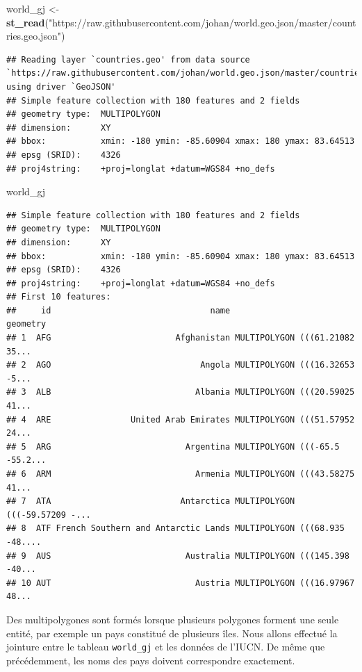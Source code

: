 \documentclass[]{book}
\newenvironment{Shaded}{\begin{snugshade}}{\end{snugshade}}
\newcommand{\KeywordTok}[1]{\textcolor[rgb]{0.13,0.29,0.53}{\textbf{#1}}}
\newcommand{\NormalTok}[1]{#1}
\newcommand{\StringTok}[1]{\textcolor[rgb]{0.31,0.60,0.02}{#1}}
\begin{document}
\begin{Shaded}
\begin{Highlighting}[]
\NormalTok{world_gj <-}\StringTok{ }\KeywordTok{st_read}\NormalTok{(}\StringTok{"https://raw.githubusercontent.com/johan/world.geo.json/master/countries.geo.json"}\NormalTok{)}
\end{Highlighting}
\end{Shaded}

\begin{verbatim}
## Reading layer `countries.geo' from data source `https://raw.githubusercontent.com/johan/world.geo.json/master/countries.geo.json' using driver `GeoJSON'
## Simple feature collection with 180 features and 2 fields
## geometry type:  MULTIPOLYGON
## dimension:      XY
## bbox:           xmin: -180 ymin: -85.60904 xmax: 180 ymax: 83.64513
## epsg (SRID):    4326
## proj4string:    +proj=longlat +datum=WGS84 +no_defs
\end{verbatim}

\begin{Shaded}
\begin{Highlighting}[]
\NormalTok{world_gj}
\end{Highlighting}
\end{Shaded}

\begin{verbatim}
## Simple feature collection with 180 features and 2 fields
## geometry type:  MULTIPOLYGON
## dimension:      XY
## bbox:           xmin: -180 ymin: -85.60904 xmax: 180 ymax: 83.64513
## epsg (SRID):    4326
## proj4string:    +proj=longlat +datum=WGS84 +no_defs
## First 10 features:
##     id                                name                       geometry
## 1  AFG                         Afghanistan MULTIPOLYGON (((61.21082 35...
## 2  AGO                              Angola MULTIPOLYGON (((16.32653 -5...
## 3  ALB                             Albania MULTIPOLYGON (((20.59025 41...
## 4  ARE                United Arab Emirates MULTIPOLYGON (((51.57952 24...
## 5  ARG                           Argentina MULTIPOLYGON (((-65.5 -55.2...
## 6  ARM                             Armenia MULTIPOLYGON (((43.58275 41...
## 7  ATA                          Antarctica MULTIPOLYGON (((-59.57209 -...
## 8  ATF French Southern and Antarctic Lands MULTIPOLYGON (((68.935 -48....
## 9  AUS                           Australia MULTIPOLYGON (((145.398 -40...
## 10 AUT                             Austria MULTIPOLYGON (((16.97967 48...
\end{verbatim}

Des multipolygones sont formés lorsque plusieurs polygones forment une
seule entité, par exemple un pays constitué de plusieurs îles. Nous
allons effectué la jointure entre le tableau \texttt{world\_gj} et les
données de l'IUCN. De même que précédemment, les noms des pays doivent
correspondre exactement.
\end{document}
